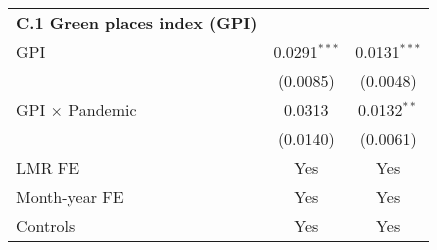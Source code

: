 {\begin{tabular}{lcc}
      \textbf{C.1 Green places index (GPI)}\\
      \hspace{0.5cm} GPI                                       & 0.0291$^{***}$  & 0.0131$^{***}$           \\
      \hspace{0.5cm}                                           & (0.0085)        & (0.0048)                 \\
      \hspace{0.5cm} GPI $\times$ Pandemic                     & 0.0313          & 0.0132$^{**}$            \\
      \hspace{0.5cm}                                           & (0.0140)        & (0.0061)                 \\
      \hline
      LMR FE                                    & Yes             & Yes                     \\
      Month-year FE                             & Yes             & Yes                     \\
      Controls                                  & Yes             & Yes                     \\
    \hline\hline
\end{tabular}
}
